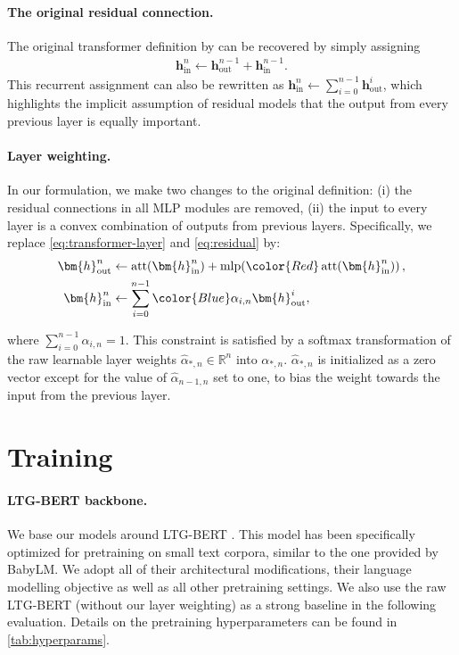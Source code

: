 \paragraph{The original residual connection.} The original transformer definition by  can be recovered by simply assigning
\begin{align}
    \bm{h}^n_{\text{in}} \gets \bm{h}^{n-1}_{\text{out}} + \bm{h}^{n-1}_{\text{in}}.
    \label{eq:residual}
\end{align}
\noindent This recurrent assignment can also be rewritten as $\bm{h}^n_{\text{in}} \gets \sum^{n-1}_{i=0}{\bm{h}^i_{\text{out}}}$, which highlights the implicit assumption of residual models that the output from every previous layer is equally important. 

\paragraph{Layer weighting.} In our formulation, we make two changes to the original definition: {\color{Red}(i)} the residual connections in all MLP modules are removed, {\color{Blue}(ii)} the input to every layer is a convex combination of outputs from previous layers. Specifically, we replace \cref{eq:transformer-layer} and \cref{eq:residual} by:
\begin{align}
    \bm{h}^n_{\text{out}} &\gets \operatorname{att}(\bm{h}^n_{\text{in}}) + \operatorname{mlp}\!\left({\color{Red}\operatorname{att}(\bm{h}^n_{\text{in}})}\right), \label{eq:new-transformer-layer}\\
    \bm{h}^n_{\text{in}} &\gets \sum^{n-1}_{i=0}{{\color{Blue}\alpha_{i,n} }\bm{h}^i_{\text{out}}}, \label{eq:new-residual}
\end{align}

\noindent where $\sum^{n-1}_{i=0}{\alpha_{i,n} = 1}$. This constraint is satisfied by a softmax transformation of the raw learnable layer weights $\hat{\alpha}_{*,n} \in \mathbb{R}^n$ into $\alpha_{*,n}$. $\hat{\alpha}_{*,n}$ is initialized as a zero vector except for the value of $\hat{\alpha}_{n-1,n}$ set to one, to bias the weight towards the input from the previous layer. %

\section{Training}

\paragraph{LTG-BERT backbone.} We base our models around LTG-BERT \citep{samuel-etal-2023-trained}. This model has been specifically optimized for pretraining on small text corpora, similar to the one provided by BabyLM. We adopt all of their architectural modifications, their language modelling objective as well as all other pretraining settings. We also use the raw LTG-BERT (without our layer weighting) as a strong baseline in the following evaluation. Details on the pretraining hyperparameters can be found in \cref{tab:hyperparams}.


